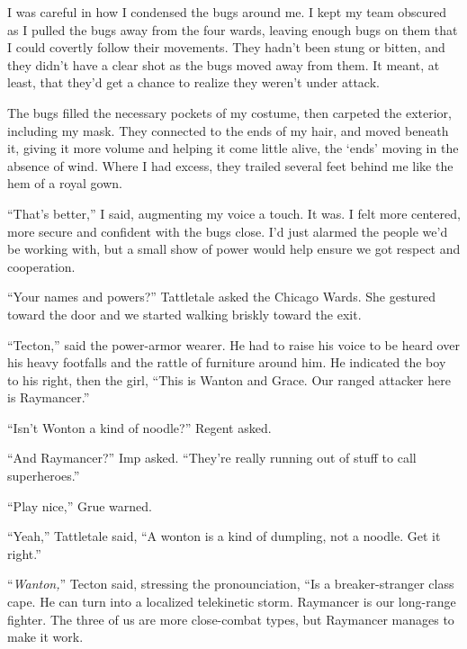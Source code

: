 I was careful in how I condensed the bugs around me.  I kept my team obscured as I pulled the bugs away from the four wards, leaving enough bugs on them that I could covertly follow their movements.  They hadn't been stung or bitten, and they didn't have a clear shot as the bugs moved away from them.  It meant, at least, that they'd get a chance to realize they weren't under attack.



The bugs filled the necessary pockets of my costume, then carpeted the exterior, including my mask.  They connected to the ends of my hair, and moved beneath it, giving it more volume and helping it come little alive, the `ends' moving in the absence of wind.  Where I had excess, they trailed several feet behind me like the hem of a royal gown.



``That's better,'' I said, augmenting my voice a touch.  It was.  I felt more centered, more secure and confident with the bugs close.  I'd just alarmed the people we'd be working with, but a small show of power would help ensure we got respect and cooperation.



``Your names and powers?'' Tattletale asked the Chicago Wards.  She gestured toward the door and we started walking briskly toward the exit.



``Tecton,'' said the power-armor wearer.  He had to raise his voice to be heard over his heavy footfalls and the rattle of furniture around him.  He indicated the boy to his right, then the girl, ``This is Wanton and Grace.  Our ranged attacker here is Raymancer.''



``Isn't Wonton a kind of noodle?'' Regent asked.



``And Raymancer?'' Imp asked.  ``They're really running out of stuff to call superheroes.''



``Play nice,'' Grue warned.



``Yeah,'' Tattletale said, ``A wonton is a kind of dumpling, not a noodle.  Get it right.''



``\emph{Wanton,}'' Tecton said, stressing the pronounciation, ``Is a breaker-stranger class cape.  He can turn into a localized telekinetic storm.  Raymancer is our long-range fighter.  The three of us are more close-combat types, but Raymancer manages to make it work.



